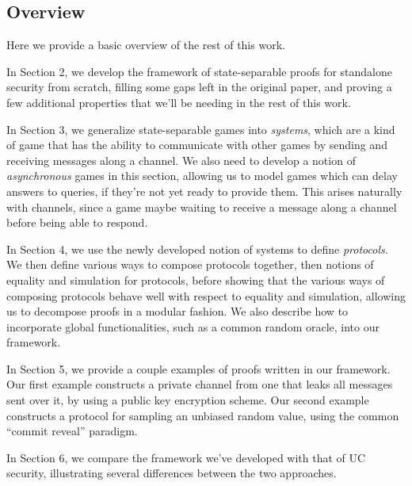 \subsection{Overview}

Here we provide a basic overview of the rest of this work.

In Section 2, we develop the framework of state-separable proofs
for standalone security from scratch, filling some gaps
left in the original paper, and proving a few additional properties
that we'll be needing in the rest of this work.

In Section 3, we generalize state-separable games into \emph{systems},
which are a kind of game that has the ability to communicate
with other games by sending and receiving messages along a channel.
We also need to develop a notion of \emph{asynchronous} games
in this section, allowing us to model games which can delay
answers to queries, if they're not yet ready to provide them.
This arises naturally with channels, since a game maybe waiting
to receive a message along a channel before being able to respond.

In Section 4, we use the newly developed notion of systems
to define \emph{protocols}.
We then define various ways to compose protocols together,
then notions of equality and simulation for protocols,
before showing that the various ways of composing protocols
behave well with respect to equality and simulation,
allowing us to decompose proofs in a modular fashion.
We also describe how to incorporate global functionalities,
such as a common random oracle, into our framework.

In Section 5, we provide a couple examples of proofs written
in our framework.
Our first example constructs a private channel from one
that leaks all messages sent over it, by using a public key encryption scheme.
Our second example constructs a protocol for sampling
an unbiased random value, using the common ``commit reveal'' paradigm.


In Section 6, we compare the framework we've developed with
that of UC security, illustrating several differences
between the two approaches.
